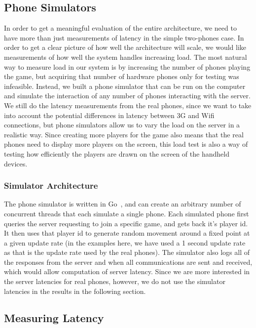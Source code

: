 \documentclass{acm_proc_article-sp}
\begin{document}
\subsection{Phone Simulators}
\label{sec:phoneSimulators}
In order to get a meaningful evaluation of the entire architecture, we
need to have more than just measurements of latency in the simple
two-phones case.  In order to get a clear picture of how well the
architecture will scale, we would like measurements of how well the
system handles increasing load.  The most natural way to measure load
in our system is by increasing the number of phones playing the game,
but acquiring that number of hardware phones only for testing was
infeasible.  Instead, we built a phone simulator that can be run on
the computer and simulate the interaction of any number of phones
interacting with the server. We still do the latency measurements from
the real phones, since we want to take into account the potential
differences in latency between 3G and Wifi connections, but phone
simulators allow us to vary the load on the server in a realistic
way. Since creating more players for the game also means that the real
phones need to display more players on the screen, this load test is
also a way of testing how efficiently the players are drawn on the
screen of the handheld devices.

\subsubsection{Simulator Architecture}
The phone simulator is written in Go~\cite{GoLang}, and can create an arbitrary
number of concurrent threads that each simulate a single phone.  Each
simulated phone first queries the server requesting to join a specific
game, and gets back it's player id.  It then uses that player id to
generate random movement around a fixed point at a given update rate
(in the examples here, we have used a 1 second update rate as that is
the update rate used by the real phones). The simulator also logs all
of the responses from the server and when all communications are sent
and received, which would allow computation of server latency.  Since
we are more interested in the server latencies for real phones,
however, we do not use the simulator latencies in the results in the
following section.

\subsection{Measuring Latency}\label{measuring}
\end{document}
